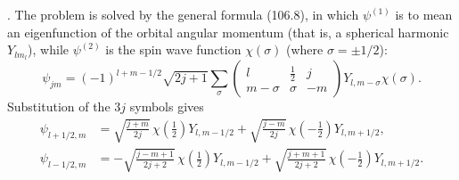 \SolutionHeading. The problem is solved by the general formula (106.8), in which $\psi^{(1)}$ is to mean an eigenfunction of the orbital angular momentum (that is, a spherical harmonic $Y_{lm_l}$), while $\psi^{(2)}$ is the spin wave function $\chi(\sigma)$ (where $\sigma=\pm1/2$):
\[
 \psi_{jm}=(-1)^{l+m-1/2}\sqrt{2j+1}\sum_\sigma
 \begin{pmatrix}l&\frac12&j\\m-\sigma&\sigma&-m\end{pmatrix}Y_{l,m-\sigma}\chi(\sigma).
\]
Substitution of the $3j$ symbols gives
\begin{align*}
 \psi_{l+1/2,m}&=\sqrt{\frac{j+m}{2j}}\,\chi\!\left(\frac12\right)Y_{l,m-1/2}
 +\sqrt{\frac{j-m}{2j}}\,\chi\!\left(-\frac12\right)Y_{l,m+1/2},\\
 \psi_{l-1/2,m}&=-\sqrt{\frac{j-m+1}{2j+2}}\,\chi\!\left(\frac12\right)Y_{l,m-1/2}
 +\sqrt{\frac{j+m+1}{2j+2}}\,\chi\!\left(-\frac12\right)Y_{l,m+1/2}.
\end{align*}

